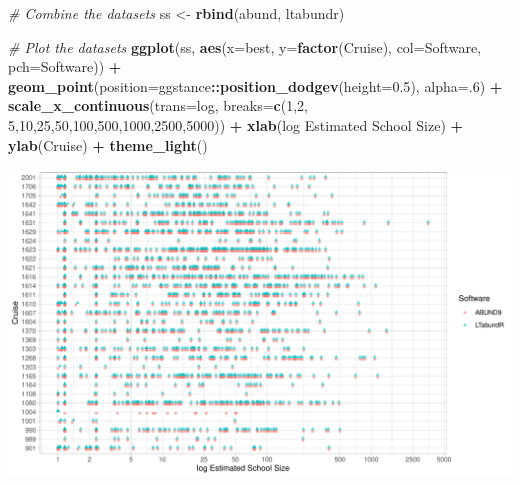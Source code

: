 \documentclass[
]{book}
\newenvironment{Shaded}{\begin{snugshade}}{\end{snugshade}}
\newcommand{\AttributeTok}[1]{\textcolor[rgb]{0.13,0.29,0.53}{#1}}
\newcommand{\CommentTok}[1]{\textcolor[rgb]{0.56,0.35,0.01}{\textit{#1}}}
\newcommand{\DecValTok}[1]{\textcolor[rgb]{0.00,0.00,0.81}{#1}}
\newcommand{\FloatTok}[1]{\textcolor[rgb]{0.00,0.00,0.81}{#1}}
\newcommand{\FunctionTok}[1]{\textcolor[rgb]{0.13,0.29,0.53}{\textbf{#1}}}
\newcommand{\NormalTok}[1]{#1}
\newcommand{\OtherTok}[1]{\textcolor[rgb]{0.56,0.35,0.01}{#1}}
\newcommand{\SpecialCharTok}[1]{\textcolor[rgb]{0.81,0.36,0.00}{\textbf{#1}}}
\newcommand{\StringTok}[1]{\textcolor[rgb]{0.31,0.60,0.02}{#1}}
\begin{document}
\begin{Shaded}
\begin{Highlighting}[]
\CommentTok{\# Combine the datasets}
\NormalTok{ss }\OtherTok{\textless{}{-}} \FunctionTok{rbind}\NormalTok{(abund, ltabundr)}

\CommentTok{\# Plot the datasets}
\FunctionTok{ggplot}\NormalTok{(ss,}
       \FunctionTok{aes}\NormalTok{(}\AttributeTok{x=}\NormalTok{best, }
           \AttributeTok{y=}\FunctionTok{factor}\NormalTok{(Cruise), }
           \AttributeTok{col=}\NormalTok{Software, }
           \AttributeTok{pch=}\NormalTok{Software)) }\SpecialCharTok{+} 
      \FunctionTok{geom\_point}\NormalTok{(}\AttributeTok{position=}\NormalTok{ggstance}\SpecialCharTok{::}\FunctionTok{position\_dodgev}\NormalTok{(}\AttributeTok{height=}\FloatTok{0.5}\NormalTok{),}
                 \AttributeTok{alpha=}\NormalTok{.}\DecValTok{6}\NormalTok{) }\SpecialCharTok{+}
      \FunctionTok{scale\_x\_continuous}\NormalTok{(}\AttributeTok{trans=}\StringTok{\textquotesingle{}log\textquotesingle{}}\NormalTok{, }\AttributeTok{breaks=}\FunctionTok{c}\NormalTok{(}\DecValTok{1}\NormalTok{,}\DecValTok{2}\NormalTok{, }\DecValTok{5}\NormalTok{,}\DecValTok{10}\NormalTok{,}\DecValTok{25}\NormalTok{,}\DecValTok{50}\NormalTok{,}\DecValTok{100}\NormalTok{,}\DecValTok{500}\NormalTok{,}\DecValTok{1000}\NormalTok{,}\DecValTok{2500}\NormalTok{,}\DecValTok{5000}\NormalTok{)) }\SpecialCharTok{+}
      \FunctionTok{xlab}\NormalTok{(}\StringTok{\textquotesingle{}log Estimated School Size\textquotesingle{}}\NormalTok{) }\SpecialCharTok{+}
      \FunctionTok{ylab}\NormalTok{(}\StringTok{\textquotesingle{}Cruise\textquotesingle{}}\NormalTok{) }\SpecialCharTok{+} 
  \FunctionTok{theme\_light}\NormalTok{()}
\end{Highlighting}
\end{Shaded}

\includegraphics{figures/unnamed-chunk-128-1.pdf}
\end{document}
